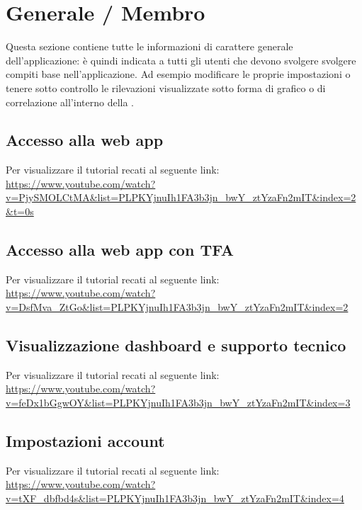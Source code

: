 \section{Generale / Membro}
Questa sezione contiene tutte le informazioni di carattere generale dell'applicazione: è quindi indicata a tutti gli utenti che devono svolgere svolgere compiti base nell'applicazione. Ad esempio modificare le proprie impostazioni o tenere sotto controllo le rilevazioni visualizzate sotto forma di grafico o di correlazione all'interno della .

\subsection{Accesso alla web app}
Per visualizzare il tutorial recati al seguente link: 
\url{https://www.youtube.com/watch?v=PjySMOLCtMA&list=PLPKYjnuIh1FA3b3jn_bwY_ztYzaFn2mIT&index=2&t=0s}

\subsection{Accesso alla web app con TFA}
Per visualizzare il tutorial recati al seguente link: 
\url{https://www.youtube.com/watch?v=DsfMva_ZtGo&list=PLPKYjnuIh1FA3b3jn_bwY_ztYzaFn2mIT&index=2}

\subsection{Visualizzazione dashboard e supporto tecnico}
Per visualizzare il tutorial recati al seguente link: 
\url{https://www.youtube.com/watch?v=feDx1bGgwOY&list=PLPKYjnuIh1FA3b3jn_bwY_ztYzaFn2mIT&index=3}

\subsection{Impostazioni account}
Per visualizzare il tutorial recati al seguente link:
\url{https://www.youtube.com/watch?v=tXF_dbfbd4s&list=PLPKYjnuIh1FA3b3jn_bwY_ztYzaFn2mIT&index=4}

